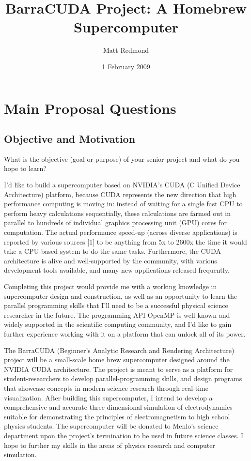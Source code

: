 \documentclass[10pt]{article}
\title{BarraCUDA Project: A Homebrew Supercomputer}  %
\author{Matt Redmond}      %
\date{1 February 2009}
\begin{document}
\maketitle
{}  
\tableofcontents
\clearpage

\section{Main Proposal Questions}
\subsection{Objective and Motivation}
What is the objective (goal or purpose) of your senior project and what do you hope to learn?

I'd like to build a supercomputer based on NVIDIA's CUDA (C Unified Device Architecture) platform, because CUDA represents the new direction that high performance computing is moving in: instead of waiting for a single fast CPU to perform heavy calculations sequentially, these calculations are farmed out in parallel to hundreds of individual graphics processing unit (GPU) cores for computation. The actual performance speed-up (across diverse applications) is reported by various sources [1] to be anything from 5x to 2600x the time it would take a CPU-based system to do the same tasks.  Furthermore, the CUDA architecture is alive and well-supported by the community, with various development tools available, and many new applications released frequently. 

Completing this project would provide me with a working knowledge in supercomputer design and construction, as well as an opportunity to learn the parallel programming skills that I'll need to be a successful physical science researcher in the future. The programming API OpenMP is well-known and widely supported in the scientific computing community, and I'd like to gain further experience working with it on a platform that can unlock all of its power. 

The BarraCUDA (Beginner's Analytic Research and Rendering Architecture) project will be a small-scale home brew supercomputer designed around the NVIDIA CUDA architecture. The project is meant to serve as a platform for student-researchers to develop parallel-programming skills, and design programs that showcase concepts in modern science research through real-time visualization. After building this supercomputer, I intend to develop a comprehensive and accurate three dimensional simulation of electrodynamics suitable for demonstrating the principles of electromagnetism to high school physics students. The supercomputer will be donated to Menlo's science department upon the project's termination to be used in future science classes. I hope to further my skills in the areas of physics research and computer simulation.
\end{document}
